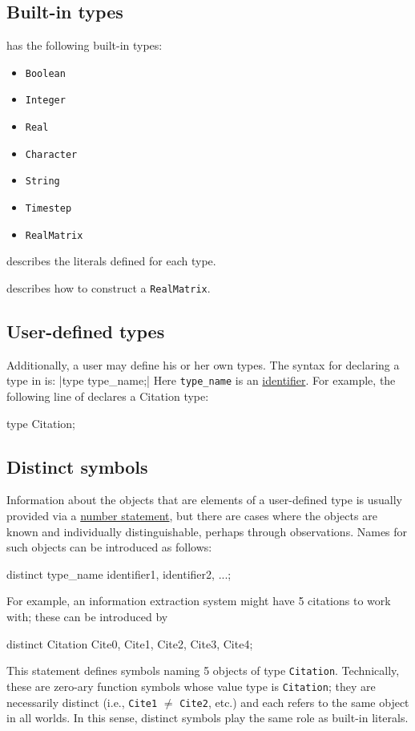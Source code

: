 \documentclass[12pt]{article}
\begin{document}
\subsection{Built-in types}\label{builtin-type-section}
\bl has the following built-in types:
\begin{itemize}
\item \verb|Boolean|
\item \verb|Integer|
\item \verb|Real|
\item \verb|Character|
\item \verb|String|
\item \verb|Timestep|
\item \verb|RealMatrix|
\end{itemize}

 describes the literals defined for each type.

 describes how to construct a \verb|RealMatrix|.


\subsection{User-defined types}\label{user-type-section}

Additionally, a user may define his or her own types.  The syntax for declaring a type in \bl is:
\blog|type type_name;|
Here \verb|type_name| is an \hyperref[identifier-section]{identifier}. 
For example, the following line of \bl declares a Citation type:
\begin{blogcode}
type Citation;
\end{blogcode}

\subsection{Distinct symbols} \label{distinct-section}
Information about the objects that are elements of a user-defined type
is usually provided via a \hyperref[number-section]{number statement}, but there are cases
where the objects are known and individually distinguishable, perhaps through observations.
Names for such objects can be introduced as follows:
\begin{blogcode}
distinct type_name identifier1, identifier2, ...;
\end{blogcode}
For example, an information extraction system might have 5 citations to work with;
these can be introduced by
\begin{blogcode}
distinct Citation Cite0, Cite1, Cite2, Cite3, Cite4;
\end{blogcode}
This statement defines symbols naming 5 objects of type {\tt Citation}.
Technically, these are zero-ary function symbols whose value type is {\tt Citation};
they are necessarily distinct  (i.e., {\tt Cite1} $\neq$ {\tt Cite2}, etc.)
and each refers to the same object in all worlds. In this sense,
distinct symbols play the same role as built-in literals.
\end{document}
